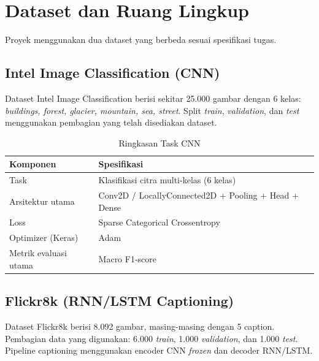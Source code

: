 \section{Dataset dan Ruang Lingkup}
Proyek menggunakan dua dataset yang berbeda sesuai spesifikasi tugas.

\subsection{Intel Image Classification (CNN)}
Dataset Intel Image Classification berisi sekitar 25.000 gambar dengan 6 kelas:
\textit{buildings, forest, glacier, mountain, sea, street}. Split \textit{train}, \textit{validation}, dan \textit{test} menggunakan pembagian yang telah disediakan dataset.

\begin{table}[H]
    \centering
    \caption{Ringkasan Task CNN}
    \begin{tabular}{ll}
        \toprule
        \textbf{Komponen} & \textbf{Spesifikasi} \\
        \midrule
        Task & Klasifikasi citra multi-kelas (6 kelas) \\
        Arsitektur utama & Conv2D / LocallyConnected2D + Pooling + Head + Dense \\
        Loss & Sparse Categorical Crossentropy \\
        Optimizer (Keras) & Adam \\
        Metrik evaluasi utama & Macro F1-score \\
        \bottomrule
    \end{tabular}
    \label{tab:ringkasan-cnn}
\end{table}

\subsection{Flickr8k (RNN/LSTM Captioning)}
Dataset Flickr8k berisi 8.092 gambar, masing-masing dengan 5 caption. Pembagian data yang digunakan: 6.000 \textit{train}, 1.000 \textit{validation}, dan 1.000 \textit{test}. Pipeline captioning menggunakan encoder CNN \textit{frozen} dan decoder RNN/LSTM.

